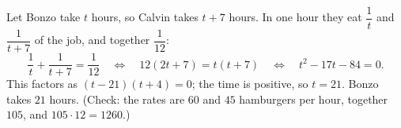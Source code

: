 Let Bonzo take $t$ hours, so Calvin takes $t+7$ hours. In one hour they eat $\dfrac{1}{t}$ and $\dfrac{1}{t+7}$ of the job, and together $\dfrac{1}{12}$:
\[
\dfrac{1}{t}+\dfrac{1}{t+7}=\dfrac{1}{12}\quad\Longleftrightarrow\quad12(2t+7)=t(t+7)\quad\Longleftrightarrow\quad t^2-17t-84=0 .
\]
This factors as $(t-21)(t+4)=0$; the time is positive, so $t=21$. Bonzo takes $\boxed{21}$ hours. (Check: the rates are $60$ and $45$ hamburgers per hour, together $105$, and $105\cdot12=1260$.)
